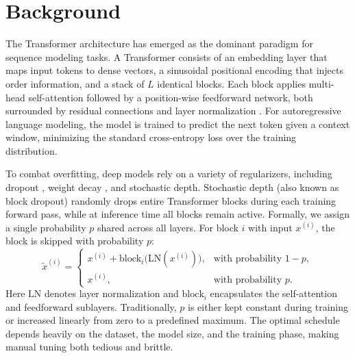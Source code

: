\documentclass{article} %
\begin{document}

\section{Background}
\label{sec:background}

The Transformer architecture \citep{vaswani2017attention} has emerged as the dominant paradigm for sequence modeling tasks. 
A Transformer consists of an embedding layer that maps input tokens to dense vectors, a sinusoidal positional encoding that injects order information, and a stack of \(L\) identical blocks. Each block applies multi-head self-attention followed by a position-wise feedforward network, both surrounded by residual connections and layer normalization \citep{ba2016layer}. 
For autoregressive language modeling, the model is trained to predict the next token given a context window, minimizing the standard cross-entropy loss over the training distribution.

To combat overfitting, deep models rely on a variety of regularizers, including dropout \citep{goodfellow2016deep}, weight decay \citep{loshchilov2017adamw}, and stochastic depth. 
Stochastic depth (also known as block dropout) randomly drops entire Transformer blocks during each training forward pass, while at inference time all blocks remain active. 
Formally, we assign a single probability \(p\) shared across all layers. For block \(i\) with input \(x^{(i)}\), the block is skipped with probability \(p\):
\[
\tilde{x}^{(i)} = \begin{cases}
x^{(i)} + \mathrm{block}_i\bigl(\mathrm{LN}(x^{(i)})\bigr), & \text{with probability } 1-p,\\[4pt]
x^{(i)}, & \text{with probability } p.
\end{cases}
\]
Here \(\mathrm{LN}\) denotes layer normalization and \(\mathrm{block}_i\) encapsulates the self-attention and feedforward sublayers. 
Traditionally, \(p\) is either kept constant during training or increased linearly from zero to a predefined maximum. 
The optimal schedule depends heavily on the dataset, the model size, and the training phase, making manual tuning both tedious and brittle.
\end{document}
